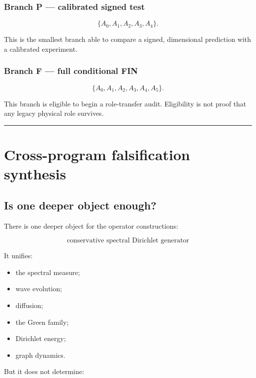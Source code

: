 \documentclass[11pt,a4paper,openany]{report}
\begin{document}
\subsection{Branch P --- calibrated signed test}

\[
\{A_0,A_1,A_2,A_3,A_4\}.
\]

This is the smallest branch able to compare a signed, dimensional prediction with a calibrated experiment.

\subsection{Branch F --- full conditional FIN}

\[
\{A_0,A_1,A_2,A_3,A_4,A_5\}.
\]

This branch is eligible to begin a role-transfer audit. Eligibility is not proof that any legacy physical role survives.

\par\medskip\hrule\medskip

\chapter{Cross-program falsification synthesis}

\section{Is one deeper object enough?}

There is one deeper object for the operator constructions:

\[
\boxed{
\text{conservative spectral Dirichlet generator}
}
\]

It unifies:

\begin{itemize}
\item 
the spectral measure;

\item 
wave evolution;

\item 
diffusion;

\item 
the Green family;

\item 
Dirichlet energy;

\item 
graph dynamics.

\end{itemize}

But it does not determine:
\end{document}
